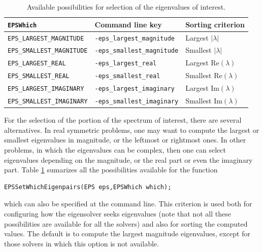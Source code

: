\begin{table}
\centering
{\small \begin{tabular}{lll}
\texttt{EPSWhich}                  & Command line key                   & Sorting criterion \\\hline
\texttt{EPS\_LARGEST\_MAGNITUDE}   & \texttt{-eps\_largest\_magnitude}  & Largest $|\lambda|$ \\
\texttt{EPS\_SMALLEST\_MAGNITUDE}  & \texttt{-eps\_smallest\_magnitude} & Smallest $|\lambda|$ \\
\texttt{EPS\_LARGEST\_REAL}        & \texttt{-eps\_largest\_real}       & Largest $\mathrm{Re}(\lambda)$ \\
\texttt{EPS\_SMALLEST\_REAL}       & \texttt{-eps\_smallest\_real}      & Smallest $\mathrm{Re}(\lambda)$ \\
\texttt{EPS\_LARGEST\_IMAGINARY}   & \texttt{-eps\_largest\_imaginary}  & Largest $\mathrm{Im}(\lambda)$\footnotemark \\
\texttt{EPS\_SMALLEST\_IMAGINARY}  & \texttt{-eps\_smallest\_imaginary} & Smallest $\mathrm{Im}(\lambda)$\addtocounter{footnote}{-1}\footnotemark \\\hline
\end{tabular} }
\caption{\label{tab:portion}Available possibilities for selection of the eigenvalues of interest.}
\end{table}


	For the selection of the portion of the spectrum of interest, there are several alternatives. In real symmetric problems, one may want to compute the largest or smallest eigenvalues in magnitude, or the leftmost or rightmost ones. In other problems, in which the eigenvalues can be complex, then one can select eigenvalues depending on the magnitude, or the real part or even the imaginary part. Table \ref{tab:portion} sumarizes all the possibilities available for the function
	\begin{Verbatim}[fontsize=\small]
	EPSSetWhichEigenpairs(EPS eps,EPSWhich which);
	\end{Verbatim}
which can also be specified at the command line. This criterion is used both for configuring how the eigensolver seeks eigenvalues (note that not all these possibilities are available for all the solvers) and also for sorting the computed values. The default is to compute the largest magnitude eigenvalues, except for those solvers in which this option is not available.

